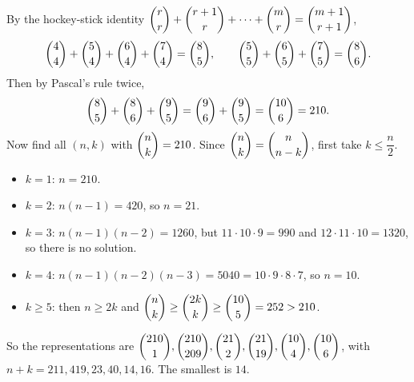 By the hockey-stick identity $\dbinom rr+\dbinom{r+1}r+\cdots+\dbinom mr=\dbinom{m+1}{r+1}$,
\[\dbinom44+\dbinom54+\dbinom64+\dbinom74=\dbinom85,\qquad \dbinom55+\dbinom65+\dbinom75=\dbinom86.\]
Then by Pascal's rule twice,
\[\dbinom85+\dbinom86+\dbinom95=\dbinom96+\dbinom95=\dbinom{10}6=210.\]
Now find all $(n,k)$ with $\dbinom nk=210$. Since $\dbinom nk=\dbinom n{n-k}$, first take $k\le\dfrac n2$.
\begin{itemize}
\item $k=1$: $n=210$.
\item $k=2$: $n(n-1)=420$, so $n=21$.
\item $k=3$: $n(n-1)(n-2)=1260$, but $11\cdot10\cdot9=990$ and $12\cdot11\cdot10=1320$, so there is no solution.
\item $k=4$: $n(n-1)(n-2)(n-3)=5040=10\cdot9\cdot8\cdot7$, so $n=10$.
\item $k\ge5$: then $n\ge2k$ and $\dbinom nk\ge\dbinom{2k}k\ge\dbinom{10}5=252>210$.
\end{itemize}
So the representations are $\dbinom{210}1,\dbinom{210}{209},\dbinom{21}2,\dbinom{21}{19},\dbinom{10}4,\dbinom{10}6$, with $n+k=211,419,23,40,14,16$. The smallest is $\boxed{14}$.
